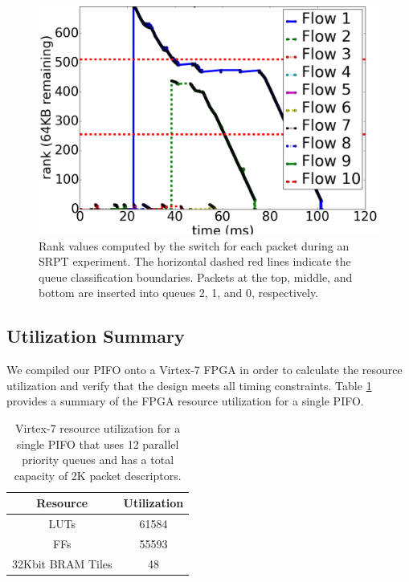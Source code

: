 \begin{figure}[!ht]
\includegraphics[width=1\linewidth]{figures/eval/srpt_ranks}
\caption{Rank values computed by the switch for each packet during an SRPT experiment. The horizontal dashed red lines indicate the queue classification boundaries. Packets at the top, middle, and bottom are inserted into queues 2, 1, and 0, respectively.}
\label{fig:srpt_ranks}
\end{figure}

\subsection{Utilization Summary}
We compiled our PIFO onto a Virtex-7 FPGA in order to calculate the resource utilization and verify that the design meets all timing constraints. Table \ref{tab:utilization} provides a summary of the FPGA resource utilization for a single PIFO.

\begin{table}[tbp]
\centering
\caption{Virtex-7 resource utilization for a single PIFO that uses 12 parallel priority queues and has a total capacity of 2K packet descriptors.}
\label{tab:utilization}
\begin{tabular}{c|c}
\textbf{Resource} & \textbf{Utilization} \\ \hline
LUTs                                    &  61584                                         \\ \hline
FFs                                     &  55593                                         \\ \hline
32Kbit BRAM Tiles                       &  48
\end{tabular}
\end{table}


